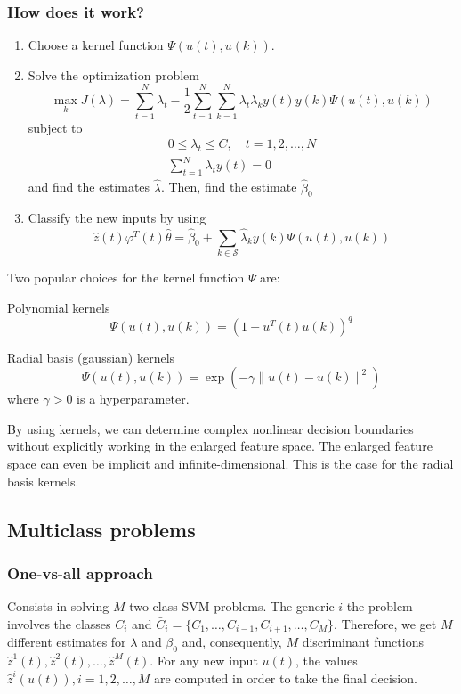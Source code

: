 \documentclass{book}
\begin{document}
\subsubsection{How does it work?}
\begin{enumerate}
  \item Choose a kernel function $\Psi(u(t),u(k))$. 
  \item Solve the optimization problem 
    \[
      \max_k J(\lambda)=\displaystyle\sum_{t=1}^{N}\lambda_t-\displaystyle\frac{1}{2}\displaystyle\sum_{t=1}^{N}\displaystyle\sum_{k=1}^{N}\lambda_t\lambda_k y(t)y(k)\Psi(u(t),u(k))
    \]
    subject to 
    \begin{gather*}
      0\leq\lambda_t\leq C,\quad t=1,2,\dots,N\\
      \displaystyle\sum_{t=1}^{N}\lambda_ty(t)=0
    \end{gather*}
    and find the estimates $\hat{\lambda}$. Then, find the estimate $\hat{\beta}_0$
  \item Classify the new inputs by using
    \[
      \hat{z}(t)\varphi^T(t)\hat{\theta}=\hat{\beta}_0+\displaystyle\sum_{k\in\mathcal{S}}^{}\hat{\lambda}_ky(k)\Psi(u(t),u(k))
    \]
\end{enumerate}
Two popular choices for the kernel function $\Psi$ are: 

Polynomial kernels 
\[
  \Psi(u(t),u(k))=(1+u^T(t)u(k))^q
\]

Radial basis (gaussian) kernels 
\[
  \Psi(u(t),u(k))=\exp(-\gamma\|u(t)-u(k)\|^2)
\]
where $\gamma>0$ is a hyperparameter. 

By using kernels, we can determine complex nonlinear decision boundaries without explicitly working in the enlarged feature space. The enlarged feature space can even be implicit and infinite-dimensional. This is the case for the radial basis kernels.
\subsection{Multiclass problems}
\subsubsection{One-vs-all approach}
Consists in solving $M$ two-class SVM problems. The generic $i$-the problem involves the classes $C_i$ and $\bar{C}_i=\{C_1,\dots,C_{i-1},C_{i+1},\dots,C_M\}$. Therefore, we get $M$ different estimates for $\lambda$ and $\beta_0$ and, consequently, $M$ discriminant functions $\hat{z}^1(t),\hat{z}^2(t),\dots,\hat{z}^M(t)$. For any new input $u(t)$, the values $\hat{z}^i(u(t)),i=1,2,\dots,M$ are computed in order to take the final decision. 
\end{document}
